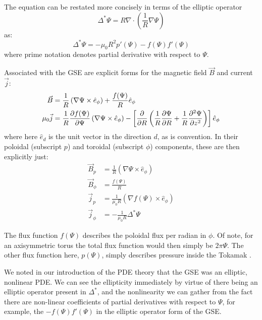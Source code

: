 \placeholderimage

\begin{remark}
    The equation can be restated more concisely in terms of the elliptic operator
    $$\Delta^{*} \Psi = R \nabla \cdot \left ( \frac{1}{R} \nabla \Psi \right )$$
    as:
    \begin{equation*}
        \Delta^{*} \Psi = -\mu_0 R^2 p'(\Psi) - f(\Psi) f'(\Psi)
    \end{equation*}
    where prime notation denotes partial derivative with respect to $\Psi$.
\end{remark}

\begin{corollary}
    Associated with the GSE are explicit forms for the magnetic field $\vec{B}$ and current $\vec{j}$:
    \begin{align}
        \vec{B} &= \frac{1}{R} \left ( \nabla \Psi \times \hat{e}_{\phi} \right ) + \frac{f(\Psi)}{R} \hat{e}_{\phi} \\
        \mu_0 \vec{j}   &= \frac{1}{R} \pdv{f(\Psi)}{\Psi} \left ( \nabla \Psi \times \hat{e}_{\phi} \right ) - \left [ \pdv{}{R} \left ( \frac{1}{R} \pdv{\Psi}{R} + \frac{1}{R} \pdv[2]{\Psi}{z}\right ) \right ] \hat{e}_{\phi}
    \end{align}
    where here $\hat{e}_{d}$ is the unit vector in the direction $d$, as is convention. In their poloidal (subscript $p$) and toroidal (subscript $\phi$) components, these are then explicitly just:
    \begin{align*}
        \vec{B}_p &= \frac{1}{R} \left ( \nabla \Psi \times \hat{e}_{\phi} \right ) \\
        \vec{B}_{\phi} &= \frac{f(\Psi)}{R} \\
        \vec{j}_p &= \frac{1}{\mu_0 R} \left ( \nabla f(\Psi) \times \hat{e}_{\phi}\right )\\
        \vec{j}_{\phi} &= -\frac{1}{\mu_0 R} \Delta^{*} \Psi
    \end{align*}
\end{corollary}

\begin{remark}
    The flux function $f(\Psi)$ describes the poloidal flux per radian in $\phi$. Of note, for an axisymmetric torus the 
    total flux function would then simply be $2\pi \Psi$. The other flux function here, $p(\Psi)$, simply describes pressure 
    inside the Tokamak \cite{gse-derivation}. 
\end{remark}

\begin{remark}
    We noted in our introduction of the PDE theory that the GSE was an elliptic, nonlinear PDE. We can see the 
    ellipticity immediately by virtue of there being an elliptic operator present in $\Delta^{*}$, and the nonlinearity 
    we can gather from the fact there are non-linear coefficients of partial derivatives with respect to $\Psi$, for example, the  
    $-f(\Psi)f'(\Psi)$ in the elliptic operator form of the GSE.
\end{remark}

